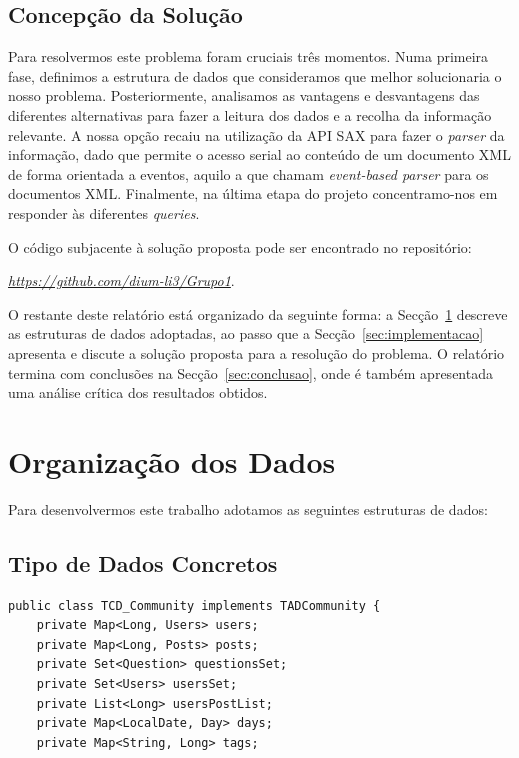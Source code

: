 \documentclass[a4paper]{article}
\begin{document}
\subsection{Concepção da Solução}
\label{sec:solucao}

Para resolvermos este problema foram cruciais três momentos. Numa primeira fase,
definimos a estrutura de dados que consideramos que melhor solucionaria o nosso
problema. Posteriormente, analisamos as vantagens e desvantagens das diferentes
alternativas para fazer a leitura dos dados e a recolha da informação relevante.
A nossa opção recaiu na utilização da API SAX para fazer o \textit{parser} da
informação, dado que permite o acesso serial ao conteúdo de um documento XML de
forma orientada a eventos, aquilo a que chamam \textit{event-based parser} para
os documentos XML.
Finalmente, na última etapa do projeto concentramo-nos em responder
às diferentes \textit{queries}.

O código subjacente à solução proposta pode ser encontrado no repositório:

\begin{center}
\href{https://github.com/dium-li3/Grupo1}{\emph{https://github.com/dium-li3/Grupo1}}.
\end{center}

O restante deste relatório está organizado da seguinte forma: a
Secção~\ref{sec:estruturadedados} descreve as estruturas de dados adoptadas,
ao passo que a Secção~\ref{sec:implementacao}  apresenta e discute a solução
proposta para a resolução do problema. O relatório termina com conclusões na
Secção~\ref{sec:conclusao}, onde é também apresentada uma análise crítica dos
resultados obtidos.



\section{Organização dos Dados}
\label{sec:estruturadedados}

Para desenvolvermos este trabalho adotamos as seguintes estruturas de dados:

\subsection{Tipo de Dados Concretos}
\label{sec:dados_concretos}

\begin{verbatim}
public class TCD_Community implements TADCommunity {
    private Map<Long, Users> users;
    private Map<Long, Posts> posts;
    private Set<Question> questionsSet;
    private Set<Users> usersSet;
    private List<Long> usersPostList;
    private Map<LocalDate, Day> days;
    private Map<String, Long> tags;
\end{verbatim}
\end{document}
